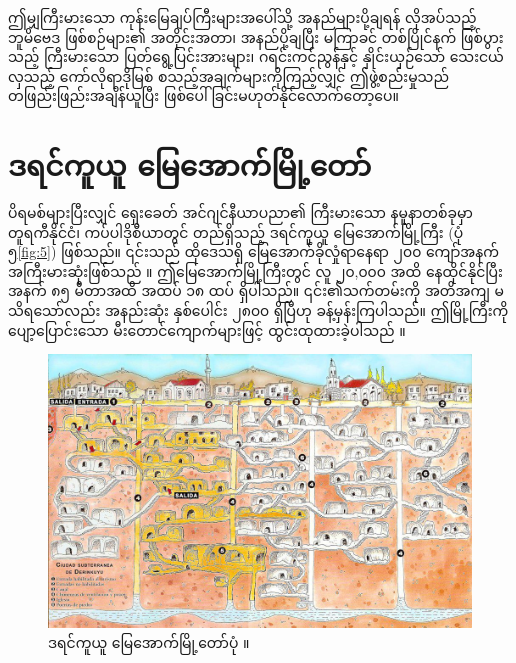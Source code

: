 \documentclass[10pt,twocolumn,letterpaper]{article}
\begin{document}
ဤမျှကြီးမားသော ကုန်းမြေချပ်ကြီးများအပေါ်သို့ အနည်များပို့ချရန် လိုအပ်သည့် ဘူမိဗေဒ ဖြစ်စဉ်များ၏ အတိုင်းအတာ၊ အနည်ပို့ချပြီး မကြာခင် တစ်ပြိုင်နက် ဖြစ်ပွားသည့် ကြီးမားသော ပြတ်ရွေ့ပြင်းအားများ၊ ဂရင်းကင်ညွန်နှင့် နှိုင်းယှဉ်သော် သေးငယ်လှသည့် ကော်လိုရာဒိုမြစ် စသည့်အချက်များကိုကြည့်လျှင် ဤဖွဲ့စည်းမှုသည် တဖြည်းဖြည်းအချိန်ယူပြီး ဖြစ်ပေါ်ခြင်းမဟုတ်နိုင်လောက်တော့ပေ။

\section{ဒရင်ကူယူ မြေအောက်မြို့တော်}

ပိရမစ်များပြီးလျှင် ရှေးခေတ် အင်ဂျင်နီယာပညာ၏ ကြီးမားသော နမူနာတစ်ခုမှာ တူရကီနိုင်ငံ၊ ကပ်ပါဒိုစီယာတွင် တည်ရှိသည့် ဒရင်ကူယူ မြေအောက်မြို့ကြီး (ပုံ ၅\ref{fig:5}) ဖြစ်သည်။ ၎င်းသည် ထိုဒေသရှိ မြေအောက်ခိုလှုံရာနေရာ ၂၀၀ ကျော်အနက် အကြီးမားဆုံးဖြစ်သည် \cite{54}။ ဤမြေအောက်မြို့ကြီးတွင် လူ ၂၀,၀၀၀ အထိ နေထိုင်နိုင်ပြီး အနက် ၈၅ မီတာအထိ အထပ် ၁၈ ထပ် ရှိပါသည်။ ၎င်း၏သက်တမ်းကို အတိအကျ မသိရသော်လည်း အနည်းဆုံး နှစ်ပေါင်း ၂၈၀၀ ရှိပြီဟု ခန့်မှန်းကြပါသည်။ ဤမြို့ကြီးကို ပျော့ပြောင်းသော မီးတောင်ကျောက်များဖြင့် ထွင်းထုထားခဲ့ပါသည် \cite{52, 53}။

\begin{figure}[b]
\begin{center}
   \includegraphics[width=1\linewidth]{derinkuyu.jpeg}
\end{center}
   \caption{ဒရင်ကူယူ မြေအောက်မြို့တော်ပုံ \cite{56}။}
\label{fig:5}
\label{fig:onecol}
\end{figure}
\end{document}
